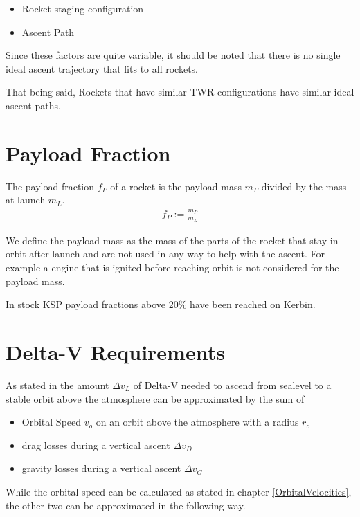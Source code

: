 \documentclass[11pt]{report}
\newcommand{\dv}{{\Delta}{v}}
\begin{document}
\begin{itemize}
\item Rocket staging configuration
\item Ascent Path
\end{itemize}

Since these factors are quite variable, it should be noted that there
is no single ideal ascent trajectory that fits to all rockets.

That being said, Rockets that have similar TWR-configurations have
similar ideal ascent paths.

\section{Payload Fraction}

The payload fraction $f_P$ of a rocket is the payload mass $m_P$ divided by
the mass at launch $m_L$.
\begin{align}
  f_P := \frac{m_P}{m_L}
\end{align}

We define the payload mass as the mass of the parts of the rocket that
stay in orbit after launch and are not used in any way to help with
the ascent. For example a engine that is ignited before reaching orbit
is not considered for the payload mass.

In stock KSP payload fractions above 20\% have been reached on
Kerbin. \cite{PayloadFractionChallenge}

\section{Delta-V Requirements}

As stated in \cite{AscentDeltaVApproximation} the amount $\dv_L$ of
Delta-V needed to ascend from sealevel to a stable orbit above the
atmosphere can be approximated by the sum of
\begin{itemize}
\item Orbital Speed $v_o$ on an orbit above the atmosphere with a
  radius $r_o$
\item drag losses during a vertical ascent $\dv_D$
\item gravity losses during a vertical ascent $\dv_G$
\end{itemize}

While the orbital speed can be calculated as stated in chapter
\ref{OrbitalVelocities}, the other two can be approximated in the
following way. \cite{AscentDeltaVApproximationFormula}
\end{document}
